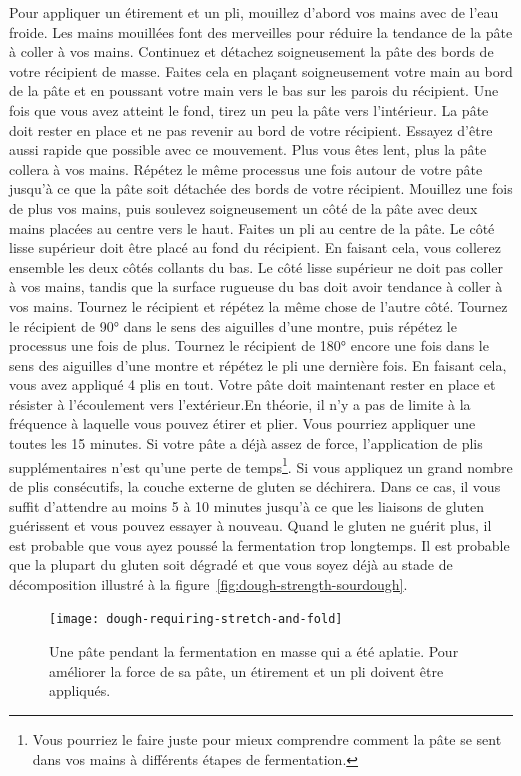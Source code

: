 Pour appliquer un étirement et un pli, mouillez d'abord vos mains avec de l'eau froide. Les mains mouillées font des merveilles pour réduire la tendance de la pâte à coller à vos mains. Continuez et détachez soigneusement la pâte des bords de votre récipient de masse. Faites cela en plaçant soigneusement votre main au bord de la pâte et en poussant votre main vers le bas sur les parois du récipient. Une fois que vous avez atteint le fond, tirez un peu la pâte vers l'intérieur. La pâte doit rester en place et ne pas revenir au bord de votre récipient. Essayez d'être aussi rapide que possible avec ce mouvement. Plus vous êtes lent, plus la pâte collera à vos mains. Répétez le même processus une fois autour de votre pâte jusqu'à ce que la pâte soit détachée des bords de votre récipient. Mouillez une fois de plus vos mains, puis soulevez soigneusement un côté de la pâte avec deux mains placées au centre vers le haut. Faites un pli au centre de la pâte. Le côté lisse supérieur doit être placé au fond du récipient. En faisant cela, vous collerez ensemble les deux côtés collants du bas. Le côté lisse supérieur ne doit pas coller à vos mains, tandis que la surface rugueuse du bas doit avoir tendance à coller à vos mains. Tournez le récipient et répétez la même chose de l'autre côté. Tournez le récipient de 90° dans le sens des aiguilles d'une montre, puis répétez le processus une fois de plus. Tournez le récipient de 180° encore une fois dans le sens des aiguilles d'une montre et répétez le pli une dernière fois. En faisant cela, vous avez appliqué 4 plis en tout. Votre pâte doit maintenant rester en place et résister à l'écoulement vers l'extérieur.En théorie, il n'y a pas de limite à la fréquence à laquelle vous pouvez étirer et plier. Vous pourriez
appliquer une toutes les 15 minutes. Si votre pâte a déjà assez de force,
l'application de plis supplémentaires n'est qu'une perte de temps\footnote{Vous pourriez le faire
juste pour mieux comprendre comment la pâte se sent dans vos mains à différents
étapes de fermentation.}. Si vous appliquez un grand nombre de plis consécutifs, la
couche externe de gluten
se déchirera. Dans ce cas, il vous suffit d'attendre au moins 5 à 10 minutes jusqu'à ce que
les liaisons de gluten guérissent et vous pouvez essayer à nouveau. Quand le gluten ne guérit
plus, il est probable que vous ayez poussé la fermentation trop longtemps. Il est probable
que la plupart du gluten soit dégradé et que vous soyez déjà
au stade de décomposition illustré à la figure~\ref{fig:dough-strength-sourdough}.

\begin{figure}[!htb]
  \texttt{[image: dough-requiring-stretch-and-fold]}
  \caption[Une pâte aplatie]{Une pâte pendant la fermentation en masse qui a
      été aplatie. Pour améliorer la force de sa pâte, un étirement et un pli doivent
      être appliqués.}
\end{figure}

